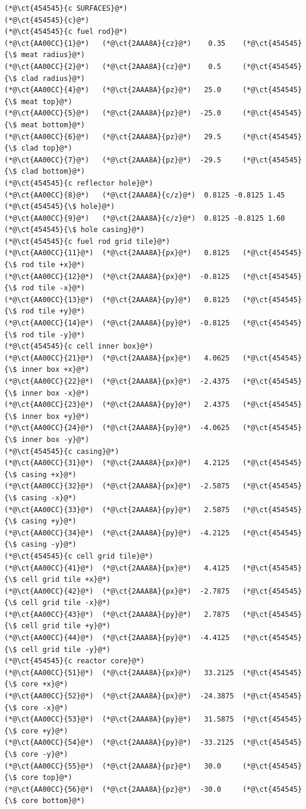 \begin{lstlisting}[firstnumber=last]
(*@\ct{454545}{c SURFACES}@*)
(*@\ct{454545}{c}@*)
(*@\ct{454545}{c fuel rod}@*)
(*@\ct{AA00CC}{1}@*)   (*@\ct{2AAA8A}{cz}@*)    0.35    (*@\ct{454545}{\$ meat radius}@*)
(*@\ct{AA00CC}{2}@*)   (*@\ct{2AAA8A}{cz}@*)    0.5     (*@\ct{454545}{\$ clad radius}@*)
(*@\ct{AA00CC}{4}@*)   (*@\ct{2AAA8A}{pz}@*)   25.0     (*@\ct{454545}{\$ meat top}@*)
(*@\ct{AA00CC}{5}@*)   (*@\ct{2AAA8A}{pz}@*)  -25.0     (*@\ct{454545}{\$ meat bottom}@*)
(*@\ct{AA00CC}{6}@*)   (*@\ct{2AAA8A}{pz}@*)   29.5     (*@\ct{454545}{\$ clad top}@*)
(*@\ct{AA00CC}{7}@*)   (*@\ct{2AAA8A}{pz}@*)  -29.5     (*@\ct{454545}{\$ clad bottom}@*)
(*@\ct{454545}{c reflector hole}@*)
(*@\ct{AA00CC}{8}@*)   (*@\ct{2AAA8A}{c/z}@*)  0.8125 -0.8125 1.45  (*@\ct{454545}{\$ hole}@*)
(*@\ct{AA00CC}{9}@*)   (*@\ct{2AAA8A}{c/z}@*)  0.8125 -0.8125 1.60  (*@\ct{454545}{\$ hole casing}@*)
(*@\ct{454545}{c fuel rod grid tile}@*)
(*@\ct{AA00CC}{11}@*)  (*@\ct{2AAA8A}{px}@*)   0.8125   (*@\ct{454545}{\$ rod tile +x}@*)
(*@\ct{AA00CC}{12}@*)  (*@\ct{2AAA8A}{px}@*)  -0.8125   (*@\ct{454545}{\$ rod tile -x}@*)
(*@\ct{AA00CC}{13}@*)  (*@\ct{2AAA8A}{py}@*)   0.8125   (*@\ct{454545}{\$ rod tile +y}@*)
(*@\ct{AA00CC}{14}@*)  (*@\ct{2AAA8A}{py}@*)  -0.8125   (*@\ct{454545}{\$ rod tile -y}@*)
(*@\ct{454545}{c cell inner box}@*)
(*@\ct{AA00CC}{21}@*)  (*@\ct{2AAA8A}{px}@*)   4.0625   (*@\ct{454545}{\$ inner box +x}@*)
(*@\ct{AA00CC}{22}@*)  (*@\ct{2AAA8A}{px}@*)  -2.4375   (*@\ct{454545}{\$ inner box -x}@*)
(*@\ct{AA00CC}{23}@*)  (*@\ct{2AAA8A}{py}@*)   2.4375   (*@\ct{454545}{\$ inner box +y}@*)
(*@\ct{AA00CC}{24}@*)  (*@\ct{2AAA8A}{py}@*)  -4.0625   (*@\ct{454545}{\$ inner box -y}@*)
(*@\ct{454545}{c casing}@*)
(*@\ct{AA00CC}{31}@*)  (*@\ct{2AAA8A}{px}@*)   4.2125   (*@\ct{454545}{\$ casing +x}@*)
(*@\ct{AA00CC}{32}@*)  (*@\ct{2AAA8A}{px}@*)  -2.5875   (*@\ct{454545}{\$ casing -x}@*)
(*@\ct{AA00CC}{33}@*)  (*@\ct{2AAA8A}{py}@*)   2.5875   (*@\ct{454545}{\$ casing +y}@*)
(*@\ct{AA00CC}{34}@*)  (*@\ct{2AAA8A}{py}@*)  -4.2125   (*@\ct{454545}{\$ casing -y}@*)
(*@\ct{454545}{c cell grid tile}@*)
(*@\ct{AA00CC}{41}@*)  (*@\ct{2AAA8A}{px}@*)   4.4125   (*@\ct{454545}{\$ cell grid tile +x}@*)
(*@\ct{AA00CC}{42}@*)  (*@\ct{2AAA8A}{px}@*)  -2.7875   (*@\ct{454545}{\$ cell grid tile -x}@*)
(*@\ct{AA00CC}{43}@*)  (*@\ct{2AAA8A}{py}@*)   2.7875   (*@\ct{454545}{\$ cell grid tile +y}@*)
(*@\ct{AA00CC}{44}@*)  (*@\ct{2AAA8A}{py}@*)  -4.4125   (*@\ct{454545}{\$ cell grid tile -y}@*)
(*@\ct{454545}{c reactor core}@*)
(*@\ct{AA00CC}{51}@*)  (*@\ct{2AAA8A}{px}@*)   33.2125  (*@\ct{454545}{\$ core +x}@*)
(*@\ct{AA00CC}{52}@*)  (*@\ct{2AAA8A}{px}@*)  -24.3875  (*@\ct{454545}{\$ core -x}@*)
(*@\ct{AA00CC}{53}@*)  (*@\ct{2AAA8A}{py}@*)   31.5875  (*@\ct{454545}{\$ core +y}@*)
(*@\ct{AA00CC}{54}@*)  (*@\ct{2AAA8A}{py}@*)  -33.2125  (*@\ct{454545}{\$ core -y}@*)
(*@\ct{AA00CC}{55}@*)  (*@\ct{2AAA8A}{pz}@*)   30.0     (*@\ct{454545}{\$ core top}@*)
(*@\ct{AA00CC}{56}@*)  (*@\ct{2AAA8A}{pz}@*)  -30.0     (*@\ct{454545}{\$ core bottom}@*)
\end{lstlisting}
